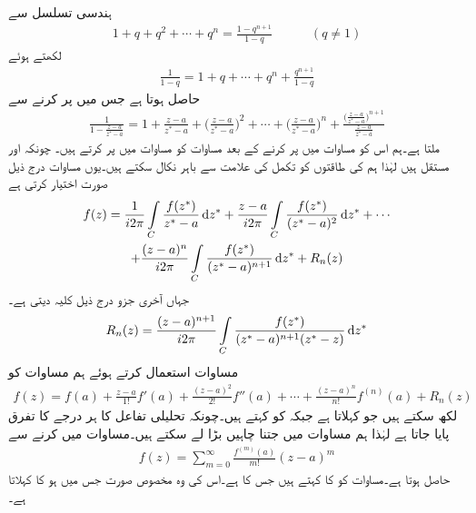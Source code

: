 ہندسی تسلسل سے
\begin{align*}
1+q+q^2+\cdots+q^n=\frac{1-q^{n+1}}{1-q}\quad \quad \quad (q\ne 1)
\end{align*}
لکھتے ہوئے 
\begin{align*}
\frac{1}{1-q}=1+q+\cdots+q^n+\frac{q^{n+1}}{1-q}
\end{align*}
حاصل ہوتا ہے جس میں  پر کرنے سے
\begin{align*}
\frac{1}{1-\frac{z-a}{z^*-a}}=1+\frac{z-a}{z^*-a}+\big(\frac{z-a}{z^*-a}\big)^2+\cdots+\big(\frac{z-a}{z^*-a}\big)^n+\frac{\big(\frac{z-a}{z^*-a}\big)^{n+1}}{\frac{z-a}{z^*-a}}
\end{align*}
ملتا ہے۔ہم اس کو مساوات  میں پر کرنے کے بعد مساوات  کو مساوات  میں پر کرتے ہیں۔ چونکہ  اور  مستقل ہیں لہٰذا ہم  کی طاقتوں کو تکمل کی علامت سے باہر نکال سکتے ہیں۔یوں مساوات  درج ذیل صورت اختیار کرتی ہے
\begin{multline}\label{مساوات_ٹیلر_کوشی_کلیہ_تکمل_ٹیلر_ت}
f(z)=\frac{1}{i2\pi}\int\limits_C \frac{f(z^*)}{z^*-a}\dif z^*+\frac{z-a}{i2\pi}\int\limits_C \frac{f(z^*)}{(z^*-a)^2}\dif z^*+\cdots\\
+\frac{(z-a)^n}{i2\pi}\int\limits_C \frac{f(z^*)}{(z^*-a)^{n+1}}\dif z^*+R_n(z)
\end{multline}
جہاں آخری جزو درج ذیل کلیہ دیتی ہے۔
\begin{align}\label{مساوات_ٹیلر_کوشی_کلیہ_تکمل_ٹیلر_ٹ}
R_n(z)=\frac{(z-a)^{n+1}}{i2\pi}\int\limits_C \frac{f(z^*)}{(z^*-a)^{n+1}(z^*-z)}\dif z^*
\end{align}
مساوات  استعمال کرتے ہوئے ہم مساوات  کو
\begin{align}\label{مساوات_ٹیلر_کوشی_کلیہ_تکمل_ٹیلر_ث}
f(z)=f(a)+\frac{z-a}{1!}f'(a)+\frac{(z-a)^2}{2!}f''(a)+\cdots+\frac{(z-a)^n}{n!}f^{(n)}(a)+R_n(z)
\end{align}
لکھ سکتے ہیں جو  کہلاتا ہے جبکہ  کو  کہتے ہیں۔چونکہ تحلیلی تفاعل  کا ہر درجے کا تفرق پایا جاتا ہے لہٰذا ہم مساوات  میں  جتنا چاہیں بڑا لے سکتے ہیں۔مساوات  میں  کرنے سے 
\begin{align}\label{مساوات_ٹیلر_کوشی_کلیہ_تکمل_ٹیلر_ج}
f(z)=\sum\limits_{m=0}^{\infty} \frac{f^{(m)}(a)}{m!}(z-a)^m
\end{align}
حاصل ہوتا ہے۔مساوات  کو  کا  کہتے ہیں جس کا   ہے۔اس کی وہ مخصوص صورت جس میں  ہو  کا   کہلاتا ہے۔ 

